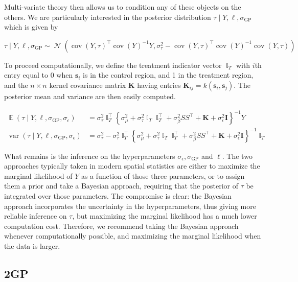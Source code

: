 \documentclass[letter]{article}
\newcommand{\genericdel}[3]{%
      \left#1#3\right#2
    }
\newcommand{\del}[1]{\genericdel(){#1}}
\newcommand{\cbr}[1]{\genericdel\{\}{#1}}
\DeclareMathOperator{\E}{\mathbb{E}}
\DeclareMathOperator{\cov}{{cov}}
\DeclareMathOperator{\var}{{var}}
\DeclareMathOperator{\Ind}{\mathbb{I}}
\DeclareMathOperator{\normal}{\mathcal{N}}
\newcommand{\trans}{^{\intercal}}
\newcommand{\sigmaf}{\sigma_{\mathrm{GP}}}
\newcommand{\sigman}{\sigma_{\epsilon}}
\newcommand{\sigmatau}{\sigma_{\tau}}
\newcommand{\sigmabeta}{\sigma_{\beta}}
\newcommand{\sigmamu}{\sigma_{\mu}}
\newcommand{\svec}{\mathbold{s}}
\newcommand{\vectreat}{\Ind_{T}}
\newcommand{\eye}{\mathbf{I}}
\newcommand{\K}{\mathbf{K}}
\begin{document}
Multi-variate theory then allows us to condition any of these objects on
the others. We are particularly interested in the posterior distribution
\(\tau \mid Y, \ell, \sigmaf\) which is given by

\begin{equation}
    \tau \mid Y, \ell, \sigmaf \sim \normal\del{\cov\del{Y,\tau}\trans \cov\del{Y}^{-1} Y, \sigma_\tau^2 - \cov\del{Y,\tau}\trans \cov\del{Y}^{-1} \cov\del{Y,\tau}}
\end{equation}

To proceed computationally, we define the treatment indicator vector
\(\vectreat\) with \(i\)th entry equal to 0 when \(\svec_i\) is in the
control region, and 1 in the treatment region, and the \(n \times n\)
kernel covariance matrix \(\K\) having entries
\(\K_{ij}=k(\svec_i, \svec_j)\). The posterior mean and variance are
then easily computed.

\begin{equation}\begin{split}
    \E \del{\tau \mid Y, \ell, \sigmaf, \sigman} &= \sigmatau^2 \vectreat\trans \cbr{\sigmamu^2 + \sigmatau^2 \vectreat \vectreat\trans + \sigmabeta^2 S S\trans + \K + \sigman^2 \eye }^{-1} Y \\
    \var \del{\tau \mid Y, \ell, \sigmaf, \sigman} &= \sigma_\tau^2 - \sigma_\tau^2 \vectreat\trans \cbr{\sigmamu^2 + \sigmatau^2 \vectreat \vectreat\trans + \sigmabeta^2 S S\trans + \K + \sigman^2 \eye }^{-1} \vectreat
\end{split}\end{equation}

What remains is the inference on the hyperparameters
\(\sigman, \sigmaf\) and \(\ell\). The two approaches typically taken in
modern spatial statistics are either to maximize the marginal likelihood
of \(Y\) as a function of those three parameters, or to assign them a
prior and take a Bayesian approach, requiring that the posterior of
\(\tau\) be integrated over those parameters. The compromise is clear:
the Bayesian approach incorporates the uncertainty in the
hyperparameters, thus giving more reliable inference on \(\tau\), but
maximizing the marginal likelihood has a much lower computation cost.
Therefore, we recommend taking the Bayesian approach whenever
computationally possible, and maximizing the marginal likelihood when
the data is larger.
    


    	\subsection{2GP}\label{gp}
\end{document}
